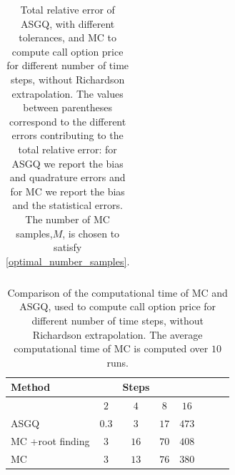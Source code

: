 \begin{table}[h!]
\begin{tabular}{l*{6}{c}r}
			\bottomrule[1.25pt]
	\end{tabular}
	\caption{Total relative  error of ASGQ, with different tolerances, and MC to compute call option price for different number of time steps, without Richardson extrapolation. The values between parentheses correspond to the different errors contributing to the total relative error: for ASGQ we report the bias and quadrature errors and for MC we report the bias and the statistical errors. The number of MC samples,$ M$, is chosen to satisfy \eqref{optimal_number_samples}.}
	\label{Total error of MISC and MC to compute Call option price of the different tolerances for different number of time steps, without Richardson extrapolation. The numbers between parentheses are the corresponding absolute errors.}
\end{table}

\FloatBarrier




\begin{table}[h!]
	\centering
	\begin{tabular}{l*{6}{c}r}
		\toprule[1.5pt]
	Method & & Steps  & &     \\
	\hline
	         & $2$ & $4$ & $8$ & $16$ &   \\
		\hline
		ASGQ  & $0.3$ & $3$ & $17$ & $473$  \\
			MC +root finding  & $3$ & $16$ & $70$ & $408$  \\
				MC  & $3$ & $13$ & $76$ & $380$  \\
%		
		\bottomrule[1.25pt]
	\end{tabular}
	\caption{Comparison of the computational time of  MC and ASGQ, used to compute call option price  for different number of time steps, without Richardson extrapolation. The average computational time of MC is computed over $10$ runs.}
	\label{Comparsion of the computational time of  MC and MISC, used to compute Call option price  for different number of time steps, without Richardson extrapolation}
\end{table}



